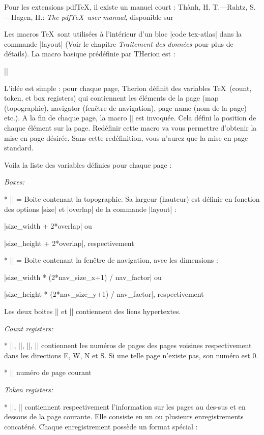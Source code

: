 Pour les extensions pdf\TeX, il existe un manuel court :
\list
  Th\`anh, H. T.---Rahtz, S.---Hagen, H.: {\it The pdf\TeX\ user manual}, 
                disponible sur  \hfil\break 
\endlist

Les macros \TeX\ sont utilis\'ees \`a l'int\'erieur d'un bloc |code tex-atlas| dans la commande |layout| 
(Voir le chapitre {\it Traitement des donn\'ees} pour plus de d\'etails). 
La macro basique pr\'ed\'efinie par THerion est :

|\dopage|

L'id\'ee est simple : pour chaque page, Therion d\'efinit des variables \TeX\ 
(count, token, et box registers) qui contiennent les \'el\'ements de la page (map (topographie), 
navigator (fen\^etre de navigation), page name (nom de la page) etc.). 
A la fin de chaque page, la macro |\dopage| est invoqu\'ee. 
Cela d\'efini la position de chaque \'el\'ement sur la page. Red\'efinir cette macro va vous permettre d'obtenir la mise en page d\'esir\'ee.
Sans cette red\'efinition, vous n'aurez que la mise en page standard.

Voila la liste des variables d\'efinies pour chaque page :

\list
  {\it Boxes:}

  * |\mapbox| = Boite contenant la topographie. Sa largeur (hauteur) est d\'efinie en fonction des options |size| et |overlap| de la commande |layout| : 

    |size_width + 2*overlap| ou
    
    |size_height + 2*overlap|, respectivement

  * |\navbox| = Boite contenant la fen\^etre de navigation, avec les dimensions :

    |size_width * (2*nav_size_x+1) / nav_factor| ou

    |size_height * (2*nav_size_y+1) / nav_factor|, respectivement

    Les deux boites |\mapbox| et |\navbox| contiennent des liens hypertextes.

  {\it Count registers:}

  * |\pointerE|, |\pointerW|, |\pointerN|, |\pointerS| contiennent les num\'eros de pages des pages voisines respectivement dans les directions E, W, N et S. 
     Si une telle page n'existe pas, son num\'ero est 0.

  * |\pagenum| num\'ero de page courant

  {\it Token registers:}

  * |\pointerU|, |\pointerD| contiennent respectivement l'information sur les pages au des-sus et en dessous de la page courante.
    Elle consiste en un ou plusieurs enregistrements concat\'en\'e. 
    Chaque enregistrement poss\`ede un format sp\'ecial :
    
